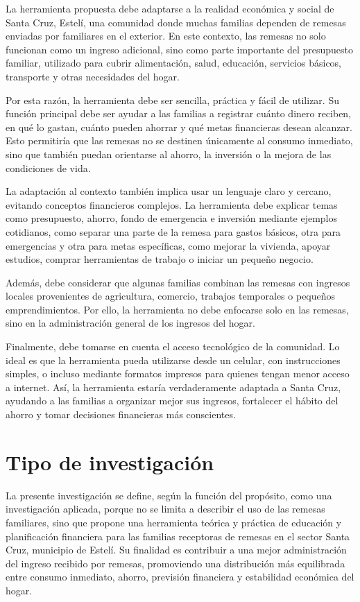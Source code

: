 \documentclass[12pt,letterpaper]{article}
\begin{document}
La herramienta propuesta debe adaptarse a la realidad económica y social de Santa Cruz, Estelí, una comunidad donde muchas familias dependen de remesas enviadas por familiares en el exterior. En este contexto, las remesas no solo funcionan como un ingreso adicional, sino como parte importante del presupuesto familiar, utilizado para cubrir alimentación, salud, educación, servicios básicos, transporte y otras necesidades del hogar.

Por esta razón, la herramienta debe ser sencilla, práctica y fácil de utilizar. Su función principal debe ser ayudar a las familias a registrar cuánto dinero reciben, en qué lo gastan, cuánto pueden ahorrar y qué metas financieras desean alcanzar. Esto permitiría que las remesas no se destinen únicamente al consumo inmediato, sino que también puedan orientarse al ahorro, la inversión o la mejora de las condiciones de vida.

La adaptación al contexto también implica usar un lenguaje claro y cercano, evitando conceptos financieros complejos. La herramienta debe explicar temas como presupuesto, ahorro, fondo de emergencia e inversión mediante ejemplos cotidianos, como separar una parte de la remesa para gastos básicos, otra para emergencias y otra para metas específicas, como mejorar la vivienda, apoyar estudios, comprar herramientas de trabajo o iniciar un pequeño negocio.

Además, debe considerar que algunas familias combinan las remesas con ingresos locales provenientes de agricultura, comercio, trabajos temporales o pequeños emprendimientos. Por ello, la herramienta no debe enfocarse solo en las remesas, sino en la administración general de los ingresos del hogar.

Finalmente, debe tomarse en cuenta el acceso tecnológico de la comunidad. Lo ideal es que la herramienta pueda utilizarse desde un celular, con instrucciones simples, o incluso mediante formatos impresos para quienes tengan menor acceso a internet. Así, la herramienta estaría verdaderamente adaptada a Santa Cruz, ayudando a las familias a organizar mejor sus ingresos, fortalecer el hábito del ahorro y tomar decisiones financieras más conscientes.

\newpage
\section{\texorpdfstring{\textbf{Tipo de investigación}}{Tipo de investigación}}\label{tipo-de-investigaciuxf3n}

La presente investigación se define, según la función del propósito, como una investigación aplicada, porque no se limita a describir el uso de las remesas familiares, sino que propone una herramienta teórica y práctica de educación y planificación financiera para las familias receptoras de remesas en el sector Santa Cruz, municipio de Estelí. Su finalidad es contribuir a una mejor administración del ingreso recibido por remesas, promoviendo una distribución más equilibrada entre consumo inmediato, ahorro, previsión financiera y estabilidad económica del hogar.
\end{document}
